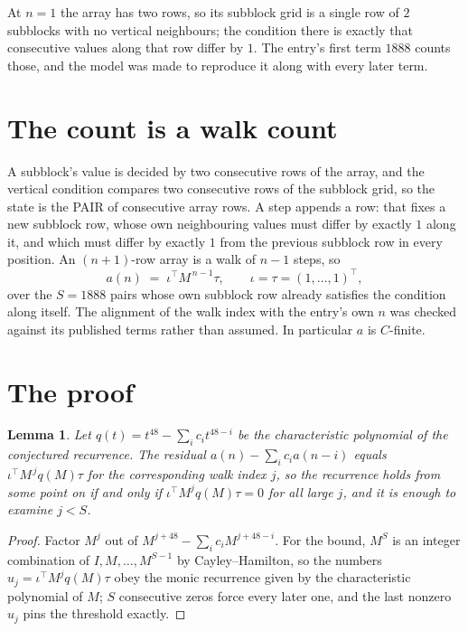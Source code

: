 \documentclass[11pt,a4paper]{article}
\theoremstyle{plain}
\newtheorem{lemma}[theorem]{Lemma}
\theoremstyle{definition}
\begin{document}
At $n=1$ the array has two rows, so its subblock grid is a single row of $2$ subblocks with
no vertical neighbours; the condition there is exactly that consecutive values along that row
differ by $1$. The entry's first term $1888$ counts those, and the model was made to
reproduce it along with every later term.

\section{The count is a walk count}

A subblock's value is decided by two consecutive rows of the array, and the
vertical condition compares two consecutive rows of the subblock grid, so the state is the
PAIR of consecutive array rows. A step appends a row: that fixes a new subblock row, whose own
neighbouring values must differ by exactly $1$ along it, and which must differ by exactly
$1$ from the previous subblock row in every position. An $(n+1)$-row array is a walk of
$n-1$ steps, so
\[
a(n)\;=\;\iota^{\!\top}M^{\,n-1}\tau,\qquad\iota=\tau=(1,\dots,1)^{\!\top},
\]
over the $S=1888$ pairs whose own subblock row already satisfies the condition along itself.
The alignment of the walk index with the entry's own $n$ was checked against its published
terms rather than assumed. In particular $a$ is $C$-finite.

\section{The proof}

\begin{lemma}\label{lem:crit}
Let $q(t)=t^{48}-\sum_i c_it^{48-i}$ be the characteristic polynomial of the
conjectured recurrence. The residual $a(n)-\sum_ic_ia(n-i)$ equals
$\iota^{\!\top}M^{\,j}q(M)\tau$ for the corresponding walk index $j$, so the recurrence
holds from some point on if and only if $\iota^{\!\top}M^{j}q(M)\tau=0$ for all large $j$,
and it is enough to examine $j<S$.
\end{lemma}

\begin{proof}
Factor $M^{j}$ out of $M^{j+48}-\sum_ic_iM^{j+48-i}$. For the bound, $M^{S}$
is an integer combination of $I,M,\dots,M^{S-1}$ by Cayley--Hamilton, so the numbers
$u_j=\iota^{\!\top}M^{j}q(M)\tau$ obey the monic recurrence given by the characteristic
polynomial of $M$; $S$ consecutive zeros force every later one, and the last nonzero $u_j$
pins the threshold exactly.
\end{proof}
\end{document}
